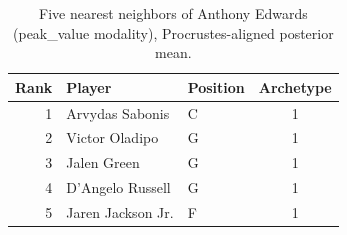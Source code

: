 \begin{table}[htbp]
  \centering\small
  \begin{tabular}{rllc}
    \toprule
    Rank & Player & Position & Archetype \\
    \midrule
    1 & Arvydas Sabonis & C & 1 \\
    2 & Victor Oladipo & G & 1 \\
    3 & Jalen Green & G & 1 \\
    4 & D'Angelo Russell & G & 1 \\
    5 & Jaren Jackson Jr. & F & 1 \\
    \bottomrule
  \end{tabular}
  \caption{Five nearest neighbors of Anthony Edwards (peak_value modality), Procrustes-aligned posterior mean.}
  \label{tab:Anthony_Edwards_neighbors_peak_value}
\end{table}

